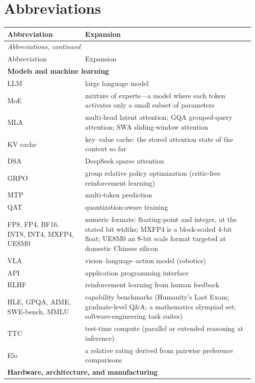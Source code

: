 \section*{Abbreviations}

\begin{longtable}{p{26mm}p{112mm}}
\toprule
Abbreviation & Expansion \\
\midrule
\endfirsthead
\multicolumn{2}{l}{\footnotesize\emph{Abbreviations, continued}} \\
\toprule
Abbreviation & Expansion \\
\midrule
\endhead
\multicolumn{2}{l}{\textbf{Models and machine learning}} \\
\midrule
LLM & large language model \\
MoE & mixture of experts---a model where each token activates only a small subset of parameters \\
MLA & multi-head latent attention; GQA grouped-query attention; SWA sliding-window attention \\
KV cache & key--value cache: the stored attention state of the context so far \\
DSA & DeepSeek sparse attention \\
GRPO & group relative policy optimization (critic-free reinforcement learning) \\
MTP & multi-token prediction \\
QAT & quantization-aware training \\
FP8, FP4, BF16, INT8, INT4, MXFP4, UE8M0 & numeric formats: floating-point and integer, at the stated bit widths; MXFP4 is a block-scaled 4-bit float; UE8M0 an 8-bit scale format targeted at domestic Chinese silicon \\
VLA & vision--language--action model (robotics) \\
API & application programming interface \\
RLHF & reinforcement learning from human feedback \\
HLE, GPQA, AIME, SWE-bench, MMLU & capability benchmarks (Humanity's Last Exam; graduate-level Q\&A; a mathematics olympiad set; software-engineering task suites) \\
TTC & test-time compute (parallel or extended reasoning at inference) \\
Elo & a relative rating derived from pairwise preference comparisons \\
\midrule
\multicolumn{2}{l}{\textbf{Hardware, architecture, and manufacturing}} \\

\end{longtable}
